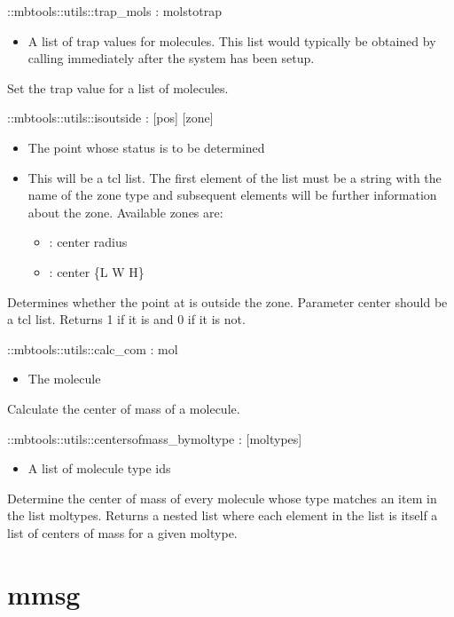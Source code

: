 \begin{code}    
  ::mbtools::utils::trap_mols  :  molstotrap
\end{code}
\begin{itemize}
\item {} A list of trap values for molecules. This list
  would typically be obtained by calling
   immediately after
  the system has been setup.
\end{itemize}
Set the trap value for a list of molecules.
\begin{code}    
  ::mbtools::utils::isoutside : [pos] [zone]
\end{code}
\begin{itemize}
\item {} The point whose status is to be determined
\item {} This will be a tcl list. The first element of the
  list must be a string with the name of the zone type and subsequent
  elements will be further information about the zone. Available zones
  are:
  \begin{itemize}
  \item {} : center radius
  \item {} : center \{L W H\}
  \end{itemize}
\end{itemize}
Determines whether the point at  is outside the
zone. Parameter center should be a tcl list. Returns 1 if it is and 0
if it is not.
\begin{code}
  ::mbtools::utils::calc_com : mol
\end{code}
\begin{itemize}
\item {} The molecule
\end{itemize}
Calculate the center of mass of a molecule.
\begin{code}    
  ::mbtools::utils::centersofmass_bymoltype : [moltypes]
\end{code}
\begin{itemize}
\item {} A list of molecule type ids
\end{itemize}
Determine the center of mass of every molecule whose type matches an
item in the list moltypes. Returns a nested list where each element in
the list is itself a list of centers of mass for a given moltype.

\section{mmsg}

